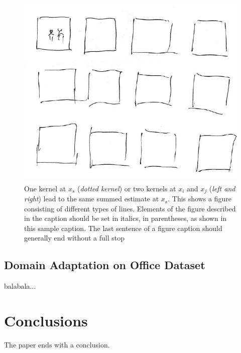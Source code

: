 \documentclass[runningheads]{llncs}
\begin{document}
\begin{figure}
\centering
\includegraphics[height=9.5cm]{images/resultimages.png}
\caption{One kernel at $x_s$ ({\it dotted kernel}) or two kernels at
$x_i$ and $x_j$ ({\it left and right}) lead to the same summed estimate
at $x_s$. This shows a figure consisting of different types of
lines. Elements of the figure described in the caption should be set in
italics,
in parentheses, as shown in this sample caption. The last
sentence of a figure caption should generally end without a full stop}
\label{fig:example}
\end{figure}

\subsection{Domain Adaptation on Office Dataset}
balabala...

\section{Conclusions}
\label{section:Conclusions}

The paper ends with a conclusion.




\end{document}

